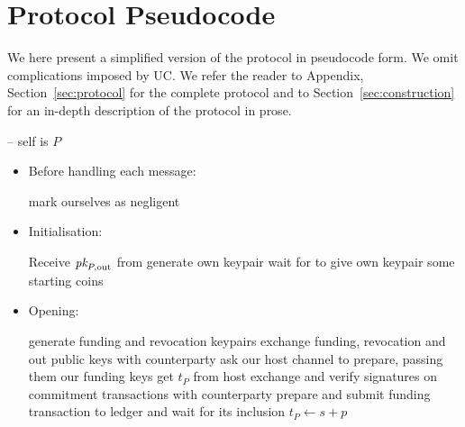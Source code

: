 \section{Protocol Pseudocode}
\label{sec:pseudocode}

We here present a simplified version of the protocol in pseudocode form. We omit
complications imposed by UC. We refer the reader to Appendix,
Section~\ref{sec:protocol} for the complete protocol and to
Section~\ref{sec:construction} for an in-depth description of the protocol in
prose.
\ \\

\begin{center}
  \begin{processbox}{\pchan -- self is $P$}
    \begin{itemize}
      \item Before handling each message:
      \begin{algorithmic}[0]
          \State mark ourselves as negligent 
        \EndIf
      \end{algorithmic}

      \item Initialisation:
      \begin{algorithmic}[0]
        \State Receive $\textit{pk}_{P, \mathrm{out}}$ from \environment{} 
        \State generate own keypair
        \State wait for \environment to give own keypair some starting coins
      \end{algorithmic}

      \item Opening:
      \begin{algorithmic}[0]
        \State generate funding and revocation keypairs
        \State exchange funding, revocation and out public keys with
        counterparty
          \State ask our host channel to prepare, passing them our funding keys
          \State get $t_P$ from host 
        \EndIf
        \State exchange and verify signatures on commitment transactions with
        counterparty
          \State prepare and submit funding transaction to ledger and wait for
          its inclusion 
          \State $t_P \gets s + p$ 
        \EndIf
      \end{algorithmic}


\end{itemize}
\end{processbox}
\end{center}
